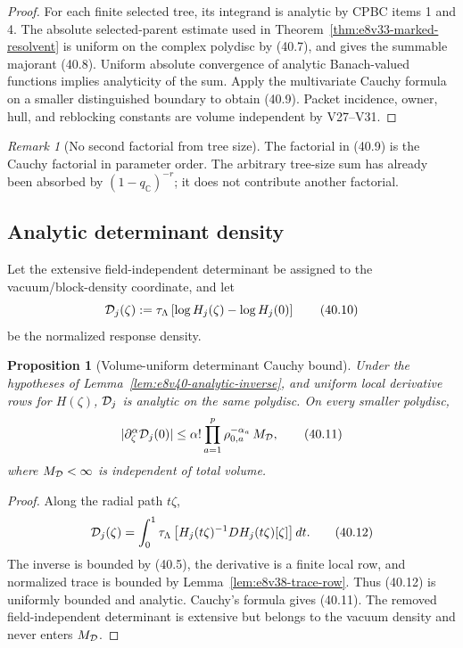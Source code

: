 \documentclass[11pt,oneside]{book}
\newtheorem{proposition}[theorem]{Proposition}
\theoremstyle{definition}
\theoremstyle{remark}
\newtheorem{remark}[theorem]{Remark}
\begin{document}
\begin{proof}
For each finite selected tree, its integrand is analytic by CPBC
items 1 and 4.  The absolute selected-parent estimate used in
Theorem~\ref{thm:e8v33-marked-resolvent} is uniform on the complex
polydisc by (40.7), and gives the summable majorant (40.8).  Uniform
absolute convergence of analytic Banach-valued functions implies
analyticity of the sum.  Apply the multivariate Cauchy formula on a
smaller distinguished boundary to obtain (40.9).  Packet incidence,
owner, hull, and reblocking constants are volume independent by
V27--V31.
\end{proof}

\begin{remark}[No second factorial from tree size]
\label{rem:e8v40-one-factorial}
The factorial in (40.9) is the Cauchy factorial in parameter order.
The arbitrary tree-size sum has already been absorbed by
\((1-q_{\mathbb C})^{-r}\); it does not contribute another
factorial.
\end{remark}

\subsection{Analytic determinant density}

Let the extensive field-independent determinant be assigned to the
vacuum/block-density coordinate, and let
\[
 {\cal D}_j(\zeta):=
 \tau_\Lambda\left[
 \log H_j(\zeta)-\log H_j(0)
 \right]                                                        \tag{40.10}
\]
be the normalized response density.

\begin{proposition}[Volume-uniform determinant Cauchy bound]
\label{prop:e8v40-det-Cauchy}
Under the hypotheses of
Lemma~\ref{lem:e8v40-analytic-inverse}, and uniform local derivative
rows for \(H(\zeta)\), \({\cal D}_j\) is analytic on the same
polydisc.  On every smaller polydisc,
\[
 |\partial_\zeta^\alpha{\cal D}_j(0)|
 \leq
 \alpha!
 \prod_{a=1}^p\rho_{0,a}^{-\alpha_a}\,M_{\cal D},                \tag{40.11}
\]
where \(M_{\cal D}<\infty\) is independent of total volume.
\end{proposition}

\begin{proof}
Along the radial path \(t\zeta\),
\[
 {\cal D}_j(\zeta)
 =
 \int_0^1
 \tau_\Lambda\left[
 H_j(t\zeta)^{-1}D H_j(t\zeta)[\zeta]
 \right]dt.                                                     \tag{40.12}
\]
The inverse is bounded by (40.5), the derivative is a finite local
row, and normalized trace is bounded by
Lemma~\ref{lem:e8v38-trace-row}.  Thus (40.12) is uniformly bounded
and analytic.  Cauchy's formula gives (40.11).  The removed
field-independent determinant is extensive but belongs to the
vacuum density and never enters \(M_{\cal D}\).
\end{proof}
\end{document}
